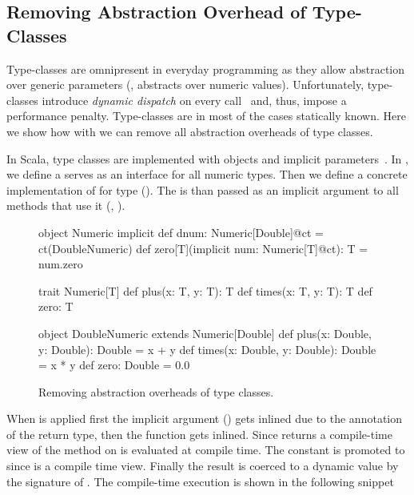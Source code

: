 \subsection{Removing Abstraction Overhead of Type-Classes}
\label{sct:type-classes-removal}

Type-classes are omnipresent in everyday programming as they allow abstraction over
 generic parameters (\eg,  abstracts over numeric values). Unfortunately,
 type-classes introduce \emph{dynamic dispatch} on every call~\cite{rompf_optimizing_2013} and,
 thus, impose a performance penalty. Type-classes are in most of the cases statically known. Here
 we show how with \tool we can remove all abstraction overheads of type classes.

In Scala, type classes are implemented with objects and implicit parameters~\cite{oliveira_type_2010}.
In , we define a  serves as an interface for
all numeric types. Then we define a concrete implementation of  for
type  (). The  is than passed
as an implicit argument  to all methods that use it (\eg, ).

\begin{figure}
\begin{listing}
object Numeric {
  implicit def dnum: Numeric[Double]@ct =
    ct(DoubleNumeric)
  def zero[T](implicit num: Numeric[T]@ct): T =
    num.zero
}

trait Numeric[T] {
  def plus(x: T, y: T): T
  def times(x: T, y: T): T
  def zero: T
}

object DoubleNumeric extends Numeric[Double] {
  def plus(x: Double, y: Double): Double = x + y
  def times(x: Double, y: Double): Double = x * y
  def zero: Double = 0.0
}
\end{listing}
\caption{\label{fig:numeric} Removing abstraction overheads of type classes.}
\end{figure}

When  is applied first the implicit argument () gets
inlined due to the  annotation of the return type, then the function  gets
inlined. Since  returns a compile-time view of 
the method  on  is evaluated at compile time. The constant  is
promoted to  since  is a compile time view. Finally the  result
is coerced to a dynamic value by the signature of . The
compile-time execution is shown in the following snippet

